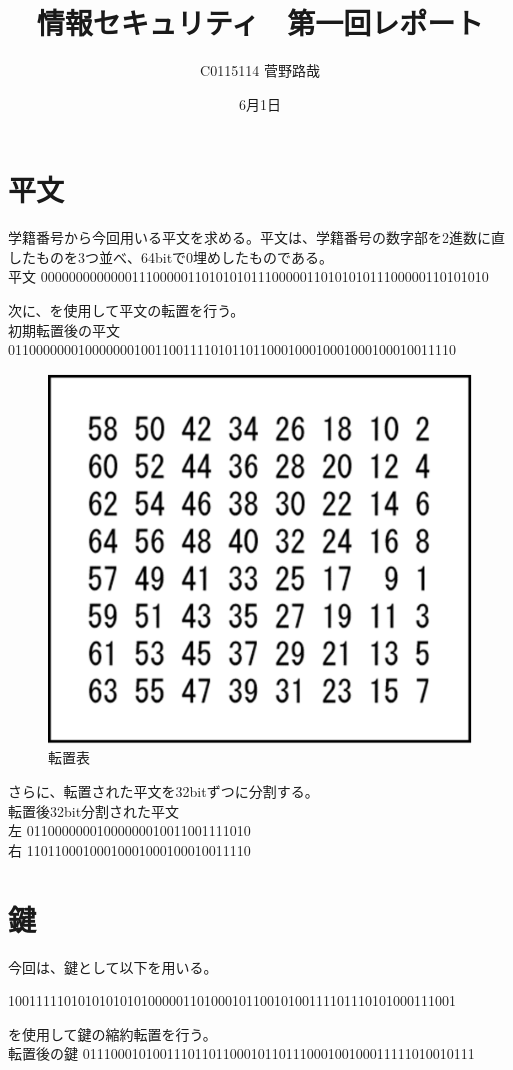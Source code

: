 \documentclass[uplatex]{jsarticle}
\title{情報セキュリティ　第一回レポート}
\author{C0115114 菅野路哉}
\date{6月1日}
\begin{document}
\maketitle

\section{平文}
学籍番号から今回用いる平文を求める。平文は、学籍番号の数字部を2進数に直したものを3つ並べ、64bitで0埋めしたものである。\\
平文
0000000000000111000001101010101110000011010101011100000110101010


次に、を使用して平文の転置を行う。\\
初期転置後の平文
0110000000100000001001100111101011011000100010001000100010011110

\begin{figure}[h]
  \begin{center}
    \includegraphics[width=0.5\linewidth]{syoki.eps}
    \caption{転置表}
    \label{figs0}
  \end{center}
\end{figure}


さらに、転置された平文を32bitずつに分割する。\\
転置後32bit分割された平文\\
左 01100000001000000010011001111010\\
右 11011000100010001000100010011110


\section{鍵}
今回は、鍵として以下を用いる。


1001111101010101010100000110100010110010100111101110101000111001


を使用して鍵の縮約転置を行う。\\
転置後の鍵
01110001010011101101100010110111000100100011111010010111
\end{document}
